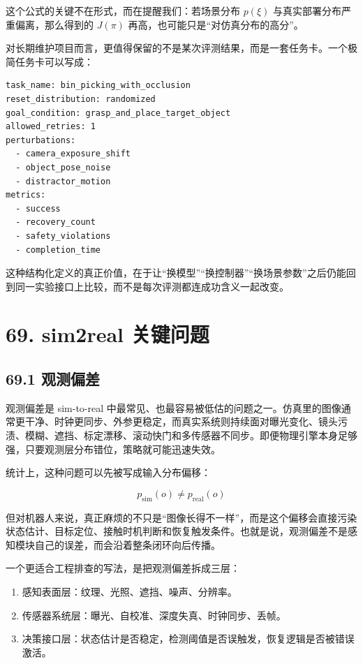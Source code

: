 这个公式的关键不在形式，而在提醒我们：若场景分布 \(p(\xi)\) 与真实部署分布严重偏离，那么得到的 \(J(\pi)\) 再高，也可能只是“对仿真分布的高分”。

对长期维护项目而言，更值得保留的不是某次评测结果，而是一套任务卡。一个极简任务卡可以写成：

\begin{lstlisting}
task_name: bin_picking_with_occlusion
reset_distribution: randomized
goal_condition: grasp_and_place_target_object
allowed_retries: 1
perturbations:
  - camera_exposure_shift
  - object_pose_noise
  - distractor_motion
metrics:
  - success
  - recovery_count
  - safety_violations
  - completion_time
\end{lstlisting}

这种结构化定义的真正价值，在于让“换模型”“换控制器”“换场景参数”之后仍能回到同一实验接口上比较，而不是每次评测都连成功含义一起改变。

\chapter*{69. sim2real 关键问题}

\section*{69.1 观测偏差}


观测偏差是 sim-to-real 中最常见、也最容易被低估的问题之一。仿真里的图像通常更干净、时钟更同步、外参更稳定，而真实系统则持续面对曝光变化、镜头污渍、模糊、遮挡、标定漂移、滚动快门和多传感器不同步。即便物理引擎本身足够强，只要观测层分布错位，策略就可能迅速失效。

统计上，这种问题可以先被写成输入分布偏移：

\begin{equation*}
p_{\text{sim}}(o) \neq p_{\text{real}}(o)
\end{equation*}

但对机器人来说，真正麻烦的不只是“图像长得不一样”，而是这个偏移会直接污染状态估计、目标定位、接触时机判断和恢复触发条件。也就是说，观测偏差不是感知模块自己的误差，而会沿着整条闭环向后传播。

一个更适合工程排查的写法，是把观测偏差拆成三层：

\begin{enumerate}
\item 感知表面层：纹理、光照、遮挡、噪声、分辨率。
\item 传感器系统层：曝光、自校准、深度失真、时钟同步、丢帧。
\item 决策接口层：状态估计是否稳定，检测阈值是否误触发，恢复逻辑是否被错误激活。
\end{enumerate}


